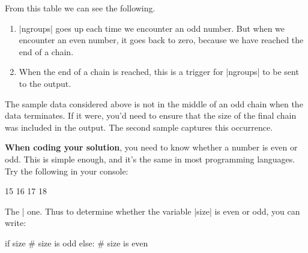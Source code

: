 From this table we can see the following.
\begin{enumerate}
  \item \pycode|ngroups| goes up each time we encounter an odd number. But when we
    encounter an even number, it goes back to zero, because we have reached the end of a
    chain.
  \item When the end of a chain is reached, this is a trigger for \pycode|ngroups| to be
    sent to the output.
\end{enumerate}

The sample data considered above is not in the middle of an odd chain when the data
terminates. If it were, you'd need to ensure that the size of the final chain was included
in the output. The second sample captures this occurrence.

\bigskip
\textbf{When coding your solution}, you need to know whether a number is even or odd. This
is simple enough, and it's the same in most programming languages. Try the following in
your console:
\begin{pythoncode}
  15 %
  16 %
  17 %
  18 %
\end{pythoncode}

The \pycode|%
one. Thus to determine whether the variable \pycode|size| is even or odd, you can write:
\begin{pythoncode}
  if size %
    # size is odd
  else:
    # size is even
\end{pythoncode}

